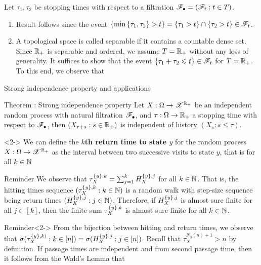 \documentclass[12pt,aspectratio=169]{beamer}
\begin{document}
\begin{frame}
\begin{Proof}
Let $\tau_1,\tau_2$ be stopping times with respect to a filtration $\mathscr{F}_{\bullet} = (\mathscr{F}_t : t \in T)$.  
\begin{enumerate}[i\_]
\item<1-> Result follows since the event $\left\{ \min \left\{ \tau_1,\tau_2\right\} > t\right\} = \left\{\tau_1 > t\right\} \cap \left\{\tau_2 > t\right\} \in \mathscr{F}_t$. 
\item<2-> A topological space is called separable if it contains a countable dense set. 
Since $\mathbb{R}_+$ is separable and ordered, we assume $T = \mathbb{R}_+$ without any loss of generality. 
It suffices to show that the event $\left\{\tau_1+\tau_2 \leqslant  t\right\} \in \mathscr{F}_t$ for $T = \mathbb{R}_+$. 
To this end, we observe that 
\end{enumerate}
\end{Proof}
\end{frame}


\begin{frame}{Strong independence property and applications}
\begin{block}{Theorem : Strong independence property} Let $X: \Omega\to\mathscr{X}^{\mathbb{R}_+}$ be an independent random process with natural filtration $\mathscr{F}_\bullet$, and $\tau:\Omega\to\mathbb{R}_+$ a stopping time with respect to $\mathscr{F}_\bullet$, 
then $(X_{\tau+s}: s \in \mathbb{R}_+)$ is independent of history $(X_s: s \le \tau)$. 
\end{block}

\begin{Definition}<2-> 
We can define the \textbf{$k$th return time to state $y$} for the random process $X:\Omega\to\mathscr{X}^{\mathbb{R}_+}$ as the interval between two successive visits to state $y$, that is for all $k \in \mathbb{N}$
\end{Definition}
\end{frame}


\begin{frame}
\begin{block}{Reminder}
We observe that $\tau_X^{\left\{y\right\}, k} = \sum_{j=1}^kH_X^{\left\{y\right\}, j}$ for all $k \in \mathbb{N}$. 
That is, the hitting times sequence $(\tau_X^{\left\{y\right\},k}: k \in \mathbb{N})$ is a random walk with step-size sequence being return times $(H_X^{\left\{y\right\},j}: j \in \mathbb{N})$. 
Therefore, if $H_X^{\left\{y\right\}, j}$ is almost sure finite for all $j \in [k]$, 
then the finite sum $\tau_X^{\left\{y\right\}, k}$ is almost sure finite for all $k\in \mathbb{N}$.  
\end{block}
\begin{block}{Reminder}<2-> 
From the bijection between hitting and return times, 
we observe that $\sigma(\tau_X^{\left\{y\right\}, k)}: k \in [n]) =  \sigma(H_X^{\left\{y\right\}, j}: j \in [n])$. 
Recall that $\tau_X^{N_y(n)+1} > n$ by definition. 
If passage times are independent and \iid from second passage time, 
then it follows from the Wald's Lemma that 
\end{block}
\end{frame}
\end{document}
